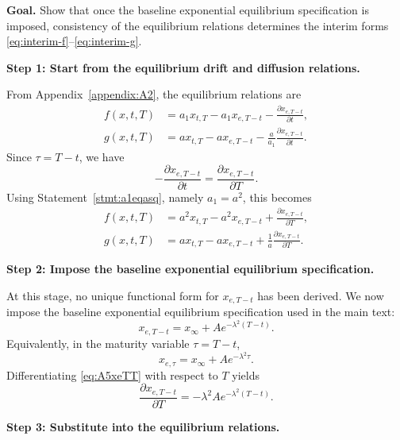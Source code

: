 \documentclass[12pt]{article}
\theoremstyle{statementstyle}
\begin{document}
\begin{appendices}
\textbf{Goal.}
Show that once the baseline exponential equilibrium specification is
imposed, consistency of the equilibrium relations determines the interim
forms \eqref{eq:interim-f}--\eqref{eq:interim-g}.

\medskip
\noindent\textbf{Step 1: Start from the equilibrium drift and diffusion relations.}

From Appendix~\ref{appendix:A2}, the equilibrium relations are
\begin{align}
f(x,t,T)
&=
a_1 x_{t,T}
-
a_1 x_{e,T-t}
-
\frac{\partial x_{e,T-t}}{\partial t},
\tag{A.5.1a}\label{eq:A5eqdrift}
\\[0.4em]
g(x,t,T)
&=
a x_{t,T}
-
a x_{e,T-t}
-
\frac{a}{a_1}\frac{\partial x_{e,T-t}}{\partial t}.
\tag{A.5.1b}\label{eq:A5eqdiff}
\end{align}
Since \(\tau=T-t\), we have
\[
-\frac{\partial x_{e,T-t}}{\partial t}
=
\frac{\partial x_{e,T-t}}{\partial T}.
\]
Using Statement~\ref{stmt:a1eqasq}, namely \(a_1=a^2\), this becomes
\begin{align}
f(x,t,T)
&=
a^{2}x_{t,T}
-
a^{2}x_{e,T-t}
+
\frac{\partial x_{e,T-t}}{\partial T},
\tag{A.5.2a}\label{eq:A5fpre}
\\[0.4em]
g(x,t,T)
&=
a x_{t,T}
-
a x_{e,T-t}
+
\frac{1}{a}\frac{\partial x_{e,T-t}}{\partial T}.
\tag{A.5.2b}\label{eq:A5gpre}
\end{align}

\medskip
\noindent\textbf{Step 2: Impose the baseline exponential equilibrium specification.}

At this stage, no unique functional form for \(x_{e,T-t}\) has been
derived. We now impose the baseline exponential equilibrium specification
used in the main text:
\begin{equation}
x_{e,T-t}
=
x_{\infty}+A e^{-\lambda^{2}(T-t)}.
\tag{A.5.3}\label{eq:A5xeTT}
\end{equation}
Equivalently, in the maturity variable \(\tau=T-t\),
\begin{equation}
x_{e,\tau}=x_{\infty}+A e^{-\lambda^{2}\tau}.
\tag{A.5.4}\label{eq:A5xe}
\end{equation}
Differentiating \eqref{eq:A5xeTT} with respect to \(T\) yields
\begin{equation}
\frac{\partial x_{e,T-t}}{\partial T}
=
-\lambda^{2}A e^{-\lambda^{2}(T-t)}.
\tag{A.5.5}\label{eq:A5xediff}
\end{equation}

\medskip
\noindent\textbf{Step 3: Substitute into the equilibrium relations.}


\end{appendices}
\end{document}
